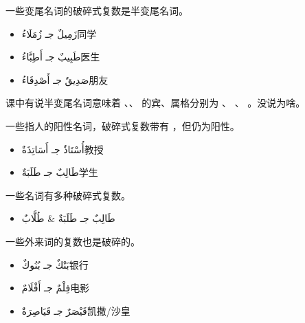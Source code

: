 一些变尾名词的破碎式复数是半变尾名词。

\begin{itemize}
    \item \ac{زَمِيلٌ جـ زُمَلَاءُ}{同学}
    \item \ac{طَبِيبٌ جـ أَطِبَّاءُ}{医生}
    \item \ac{صَدِيقٌ جـ أَصْدِقَاءُ}{朋友}
\end{itemize}

\begin{note}
    课中有说半变尾名词意味着 、、 的宾、属格分别为 、 、 。没说为啥。
\end{note}

一些指人的阳性名词，破碎式复数带有 ，但仍为阳性。

\begin{itemize}
    \item \ac{أُسْتَاذٌ جـ أَسَاتِذَةٌ}{教授}
    \item \ac{طَالِبٌ جـ طَلَبَةٌ}{学生}
\end{itemize}

一些名词有多种破碎式复数。

\begin{Arabic}
    \begin{itemize}
        \item طَالِبٌ جـ طَلَبَةٌ \& طُلَّابٌ
    \end{itemize}
\end{Arabic}

一些外来词的复数也是破碎的。

\begin{itemize}
    \item \ac{بَنْكٌ جـ بُنُوكٌ}{银行}
    \item \ac{فِلْمٌ جـ أَفْلَامٌ}{电影}
    \item \ac{قَيْصَرٌ جـ قَيَاصِرَةٌ}{凯撒/沙皇}
\end{itemize}

